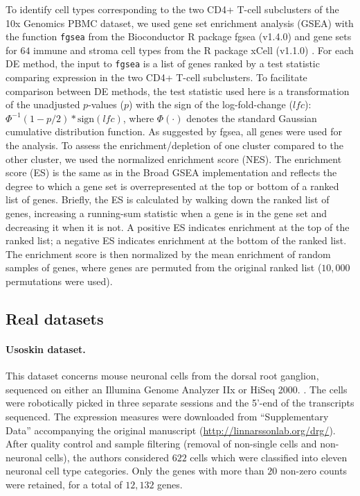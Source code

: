 \documentclass{bmcart}
\newcommand{\RPack}[1]{\textsf{#1}}
\newcommand{\RObj}[1]{\texttt{#1}}
\begin{document}
To identify cell types corresponding to the two CD4+ T-cell subclusters of the 10x Genomics PBMC dataset, we used gene set enrichment analysis (GSEA) with the function \RObj{fgsea} from the Bioconductor R package \RPack{fgsea} (v1.4.0) \citep{Sergushichev2016} and gene sets for $64$ immune and stroma cell types from the R package \RPack{xCell} (v1.1.0) \citep{Aran2017}. For each DE method, the input to \RObj{fgsea} is a list of genes ranked by a test statistic comparing expression in the two CD4+ T-cell subclusters. To facilitate comparison between DE methods, the test statistic used here is a transformation of the unadjusted $p$-values ($p$) with the sign of the log-fold-change ($lfc$): $\Phi^{-1}(1-p/2)*\text{sign}(lfc)$, where $\Phi(\cdot)$ denotes the standard Gaussian cumulative distribution function. 
As suggested by \RPack{fgsea}, all genes were used for the analysis. To assess the enrichment/depletion of one cluster compared to the other cluster, we used the normalized enrichment score (NES). The enrichment score (ES) is the same as in the Broad GSEA implementation \citep{Subramanian2005} and reflects the degree to which a gene set is overrepresented at the top or bottom of a ranked list of genes. Briefly, the ES is calculated by walking down the ranked list of genes, increasing a running-sum statistic when a gene is in the gene set and decreasing it when it is not. A positive ES indicates enrichment at the top of the ranked list; a negative ES indicates enrichment at the bottom of the ranked list. The enrichment score is then normalized by the mean enrichment of random samples of genes, where genes are permuted from the original ranked list ($10,000$ permutations were used).  

\subsection*{Real datasets}
\paragraph{Usoskin dataset.} 
This dataset concerns mouse neuronal cells from the dorsal root ganglion, sequenced on either an Illumina Genome Analyzer IIx or HiSeq 2000. \citep{Usoskin2014}. The cells were robotically picked in three separate sessions and the 5'-end of the transcripts sequenced. The expression measures were downloaded from ``Supplementary Data'' accompanying the original manuscript (\url{http://linnarssonlab.org/drg/}). After quality control and sample filtering (removal of non-single cells and non-neuronal cells), the authors considered $622$ cells which were classified into eleven neuronal cell type categories. Only the genes with more than $20$ non-zero counts were retained, for a total of $12,132$ genes.
 
\end{document}
